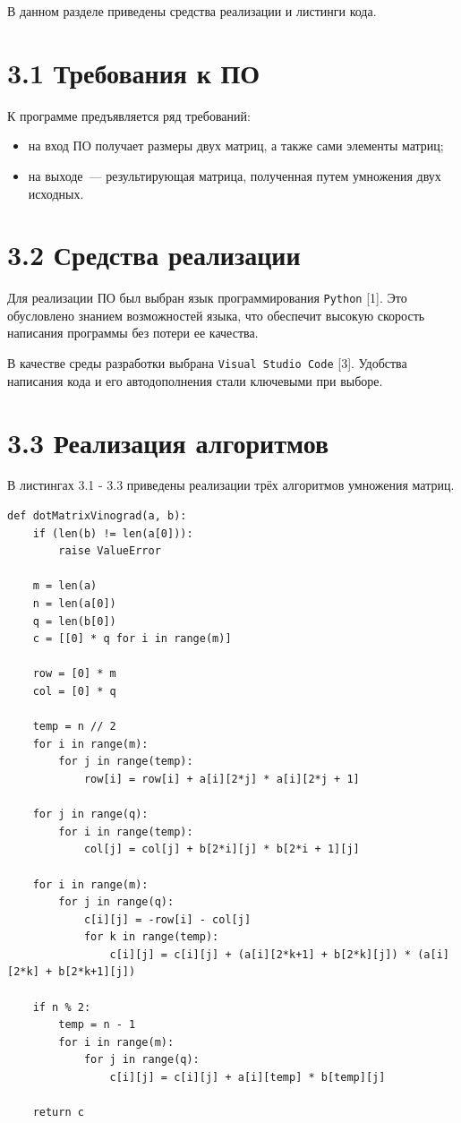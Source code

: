 \documentclass[12pt, a4paper]{report}
\begin{document}
В данном разделе приведены средства реализации и листинги кода.

\section*{3.1 Требования к ПО}

К программе предъявляется ряд требований:
\begin{itemize}
	\item на вход ПО получает размеры двух матриц, а также сами элементы матриц;
	\item на выходе~--- результирующая матрица, полученная путем умножения двух исходных.
\end{itemize}

\section*{3.2 Средства реализации}

Для реализации ПО был выбран язык программирования \verb|Python| [1]. Это обусловлено знанием возможностей языка, что обеспечит высокую скорость написания программы без потери ее качества. 

В качестве среды разработки выбрана \verb|Visual Studio Code| [3]. Удобства написания кода и его автодополнения стали ключевыми при выборе.

\section*{3.3 Реализация алгоритмов}

В листингах 3.1 - 3.3 приведены реализации трёх алгоритмов умножения матриц.

\newpage
\begin{lstlisting}[title=Листинг 3.1~--- Алгоритм Копперсмита--Винограда]
def dotMatrixVinograd(a, b):
	if (len(b) != len(a[0])):
		raise ValueError

	m = len(a)
	n = len(a[0])
	q = len(b[0])
	c = [[0] * q for i in range(m)]

	row = [0] * m
	col = [0] * q

	temp = n // 2
	for i in range(m):
		for j in range(temp):
			row[i] = row[i] + a[i][2*j] * a[i][2*j + 1]

	for j in range(q):
		for i in range(temp):
			col[j] = col[j] + b[2*i][j] * b[2*i + 1][j]

	for i in range(m):
		for j in range(q):
			c[i][j] = -row[i] - col[j]
			for k in range(temp):
				c[i][j] = c[i][j] + (a[i][2*k+1] + b[2*k][j]) * (a[i][2*k] + b[2*k+1][j])

	if n % 2:
		temp = n - 1
		for i in range(m):
			for j in range(q):
				c[i][j] = c[i][j] + a[i][temp] * b[temp][j]

	return c
\end{lstlisting}
\end{document}
